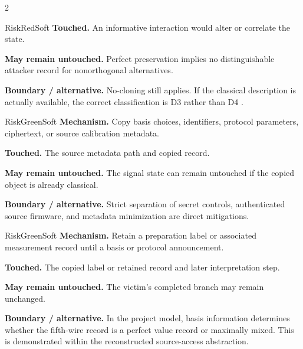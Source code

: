 \begin{multicols}{2}
\begin{matrixrecord}{RiskRedSoft}
\textbf{Touched.} An informative interaction would alter or correlate the state.

\textbf{May remain untouched.} Perfect preservation implies no distinguishable attacker record for nonorthogonal alternatives.

\textbf{Boundary / alternative.} No-cloning still applies. If the classical description is actually available, the correct classification is D3 rather than D4 \cite{wootters1982cloning,koashi2002operations}.

\hfill\matrixback
\end{matrixrecord}

\hypertarget{cell:D5}{}
\begin{matrixrecord}{RiskGreenSoft}
\textbf{Mechanism.} Copy basis choices, identifiers, protocol parameters, ciphertext, or source calibration metadata.

\textbf{Touched.} The source metadata path and copied record.

\textbf{May remain untouched.} The signal state can remain untouched if the copied object is already classical.

\textbf{Boundary / alternative.} Strict separation of secret controls, authenticated source firmware, and metadata minimization are direct mitigations.

\hfill\matrixback
\end{matrixrecord}

\hypertarget{cell:D6}{}
\begin{matrixrecord}{RiskGreenSoft}
\textbf{Mechanism.} Retain a preparation label or associated measurement record until a basis or protocol announcement.

\textbf{Touched.} The copied label or retained record and later interpretation step.

\textbf{May remain untouched.} The victim's completed branch may remain unchanged.

\textbf{Boundary / alternative.} In the project model, basis information determines whether the fifth-wire record is a perfect value record or maximally mixed. This is demonstrated within the reconstructed source-access abstraction.

\hfill\matrixback
\end{matrixrecord}


\end{multicols}

